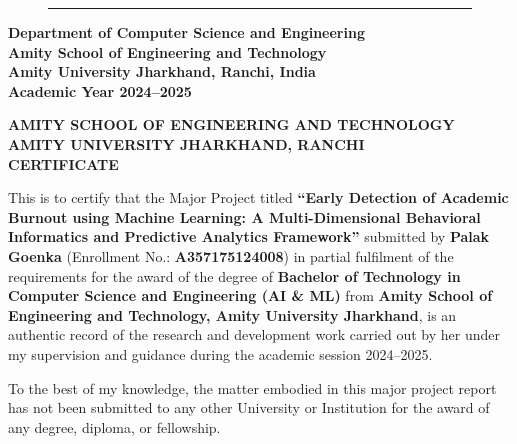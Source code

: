 \documentclass[12pt,a4paper,oneside]{report}
\begin{document}
\begin{titlepage}
\begin{center}
        \begin{figure}[H]
            \centering
            \rule{3.2cm}{3.2cm} %
        \end{figure}
        \vspace{0.2cm}
        
        \textbf{Department of Computer Science and Engineering}\\[0.1cm]
        \textbf{Amity School of Engineering and Technology}\\[0.1cm]
        \textbf{Amity University Jharkhand, Ranchi, India}\\[0.3cm]
        \textbf{Academic Year 2024--2025}
    \end{center}
\end{titlepage}

\clearpage

\thispagestyle{plain}
\begin{center}
    {\Large \textbf{AMITY SCHOOL OF ENGINEERING AND TECHNOLOGY}}\\[0.1cm]
    {\large \textbf{AMITY UNIVERSITY JHARKHAND, RANCHI}}\\[0.8cm]
    {\LARGE \textbf{CERTIFICATE}}\\[1.0cm]
\end{center}

This is to certify that the Major Project titled \textbf{``Early Detection of Academic Burnout using Machine Learning: A Multi-Dimensional Behavioral Informatics and Predictive Analytics Framework''} submitted by \textbf{Palak Goenka} (Enrollment No.: \textbf{A357175124008}) in partial fulfilment of the requirements for the award of the degree of \textbf{Bachelor of Technology in Computer Science and Engineering (AI \& ML)} from \textbf{Amity School of Engineering and Technology, Amity University Jharkhand}, is an authentic record of the research and development work carried out by her under my supervision and guidance during the academic session 2024--2025.

To the best of my knowledge, the matter embodied in this major project report has not been submitted to any other University or Institution for the award of any degree, diploma, or fellowship.

\vspace{2.5cm}
\end{document}
